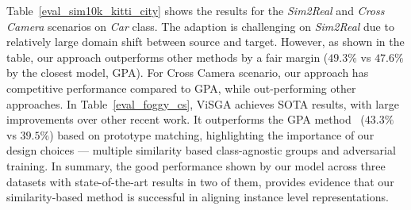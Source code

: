 \documentclass[10pt,twocolumn,letterpaper]{article}
\def\ourda{ViSGA\xspace}
\begin{document}
Table~\ref{eval_sim10k_kitti_city} shows the results for the \emph{Sim2Real} and \emph{Cross Camera} scenarios on \emph{Car} class. 
The adaption is challenging on \emph{Sim2Real} due to relatively large domain shift between source and target. However, as shown in the table, our approach outperforms other methods by a fair margin ($49.3\%$ vs $47.6\%$ by the closest model, GPA). For Cross Camera scenario, our approach has competitive performance compared to GPA\cite{GPA}, while out-performing other approaches. In Table~\ref{eval_foggy_cs}, \ourda achieves SOTA results, with large improvements over other recent work. 
It outperforms the GPA method~\cite{GPA} ($43.3\%$ vs $39.5\%$) based on prototype matching, highlighting the importance of our design choices --- multiple similarity based class-agnostic groups and adversarial training.
In summary, the good performance shown by our model across three datasets with state-of-the-art results in two of them, provides evidence that our similarity-based method is successful in aligning instance level representations. 
\begin{table}[]
\center
{}
\vspace{1mm}
\caption{Experimental results of (\%) \emph{Foggy}.}
\vspace{0mm}
\label{eval_foggy_cs}
\end{table}
\end{document}
